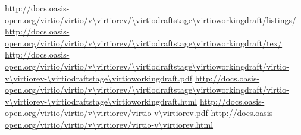 
\newcommand{\virtioversion}{Virtual I/O Device (VIRTIO) Version \virtiorev}
\newcommand{\virtiospecfile}{virtio-v\virtiorev-\virtiodraftstage\virtioworkingdraft}
\newcommand{\virtiourlbase}{http://docs.oasis-open.org/virtio/virtio/v\virtiorev/\virtiodraftstage\virtioworkingdraft}
\urldef \virtiourllistings\url{\virtiourlbase/listings/}
\urldef \virtiourltex\url{\virtiourlbase/tex/}
\urldef \virtiourlpdf\url{\virtiourlbase/\virtiospecfile.pdf}
\urldef \virtiourlhtml\url{\virtiourlbase/\virtiospecfile.html}
\urldef \virtiourllatestpdf\url{http://docs.oasis-open.org/virtio/virtio/v\virtiorev/virtio-v\virtiorev.pdf}
\urldef \virtiourllatesthtml\url{http://docs.oasis-open.org/virtio/virtio/v\virtiorev/virtio-v\virtiorev.html}
\newcommand{\virtioworkproduct}{Standards Track Work Product}
\newcommand{\virtiooasiscopyright}{Copyright © OASIS Open 2015. All Rights Reserved.}

